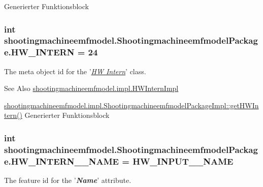 Generierter Funktionsblock  \hypertarget{interfaceshootingmachineemfmodel_1_1_shootingmachineemfmodel_package_a0ff0aa7656387125821862056ec11ca9}{
\subsubsection[{H\-W\-\_\-\-I\-N\-T\-E\-R\-N}]{\setlength{\rightskip}{0pt plus 5cm}int shootingmachineemfmodel.\-Shootingmachineemfmodel\-Package.\-H\-W\-\_\-\-I\-N\-T\-E\-R\-N = 24}}\label{interfaceshootingmachineemfmodel_1_1_shootingmachineemfmodel_package_a0ff0aa7656387125821862056ec11ca9}
The meta object id for the '\hyperlink{classshootingmachineemfmodel_1_1impl_1_1_h_w_intern_impl}{{\itshape H\-W Intern}}' class.

\begin{DoxySeeAlso}{See Also}
\hyperlink{classshootingmachineemfmodel_1_1impl_1_1_h_w_intern_impl}{shootingmachineemfmodel.\-impl.\-H\-W\-Intern\-Impl} 

\hyperlink{classshootingmachineemfmodel_1_1impl_1_1_shootingmachineemfmodel_package_impl_a4d79c0f3a00def45b86046e8908636e7}{shootingmachineemfmodel.\-impl.\-Shootingmachineemfmodel\-Package\-Impl\-::get\-H\-W\-Intern()} Generierter Funktionsblock 
\end{DoxySeeAlso}
\hypertarget{interfaceshootingmachineemfmodel_1_1_shootingmachineemfmodel_package_a9b9bd65de59c357ad73e62c76be9b4dc}{
\subsubsection[{H\-W\-\_\-\-I\-N\-T\-E\-R\-N\-\_\-\-\_\-\-N\-A\-M\-E}]{\setlength{\rightskip}{0pt plus 5cm}int shootingmachineemfmodel.\-Shootingmachineemfmodel\-Package.\-H\-W\-\_\-\-I\-N\-T\-E\-R\-N\-\_\-\-\_\-\-N\-A\-M\-E = {\bf H\-W\-\_\-\-I\-N\-P\-U\-T\-\_\-\-\_\-\-N\-A\-M\-E}}}\label{interfaceshootingmachineemfmodel_1_1_shootingmachineemfmodel_package_a9b9bd65de59c357ad73e62c76be9b4dc}
The feature id for the '{\itshape {\bfseries Name}}' attribute.

